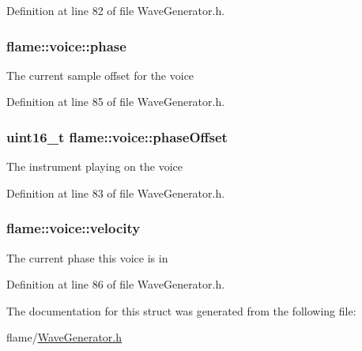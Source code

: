 Definition at line 82 of file Wave\-Generator.\-h.

\hypertarget{structflame_1_1voice_aae5caf10d82550f97fccea9f184d9ed2}{
\subsubsection[{phase}]{ flame\-::voice\-::phase}}\label{structflame_1_1voice_aae5caf10d82550f97fccea9f184d9ed2}
The current sample offset for the voice 

Definition at line 85 of file Wave\-Generator.\-h.

\hypertarget{structflame_1_1voice_a897fe7f475e9bd1ff4115dd90ad80ecf}{
\subsubsection[{phase\-Offset}]{\setlength{\rightskip}{0pt plus 5cm}uint16\-\_\-t flame\-::voice\-::phase\-Offset}}\label{structflame_1_1voice_a897fe7f475e9bd1ff4115dd90ad80ecf}
The instrument playing on the voice 

Definition at line 83 of file Wave\-Generator.\-h.

\hypertarget{structflame_1_1voice_adb0641815db4aacb1fe2fc90b605e4c1}{
\subsubsection[{velocity}]{ flame\-::voice\-::velocity}}\label{structflame_1_1voice_adb0641815db4aacb1fe2fc90b605e4c1}
The current phase this voice is in 

Definition at line 86 of file Wave\-Generator.\-h.



The documentation for this struct was generated from the following file\-:\begin{DoxyCompactItemize}
\item 
flame/\hyperlink{_wave_generator_8h}{Wave\-Generator.\-h}\end{DoxyCompactItemize}
